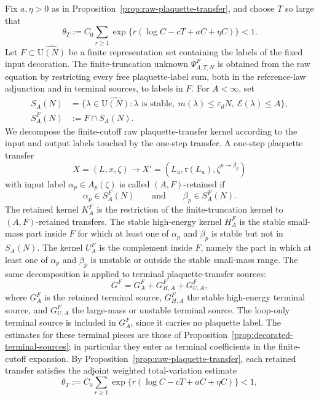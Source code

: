 \documentclass[11pt,a4paper,reqno]{amsart}
\theoremstyle{definition}
\theoremstyle{remark}
\newcommand\U{{\mathrm U}}
\begin{document}
Fix $a,\eta>0$ as in Proposition~\ref{prop:raw-plaquette-transfer}, and choose $T$ so large that
\begin{equation}
\label{eq:good-transfer-contraction}
\theta_T
:=C_0\sum_{r\ge1}\exp\{r(\log C-cT+aC+\eta C)\}<1.
\end{equation}
Let $F\subset\widehat{\U(N)}$ be a finite representation set containing the labels of the fixed input decoration.  The finite-truncation unknown $\Psi^F_{\Lambda,T,N}$ is obtained from the raw equation by restricting every free plaquette-label sum, both in the reference-law adjunction and in terminal sources, to labels in $F$.  For $A<\infty$, set
\[
\begin{aligned}
S_A(N)&=\{\lambda\in\widehat{\U(N)}:
\lambda\text{ is stable},\ m(\lambda)\le\varepsilon_dN,
\ \mathcal E(\lambda)\le A\},\\
S_A^F(N)&:=F\cap S_A(N).
\end{aligned}
\]
We decompose the finite-cutoff raw plaquette-transfer kernel according to the input and output labels touched by the one-step transfer. A one-step plaquette transfer
\[
X=(L,x,\zeta)\longrightarrow X'=(L_u,\mathfrak r(L_u),\zeta^{p\to\beta_p})
\]
with input label $\alpha_p\in A_p(\zeta)$ is called $(A,F)$-retained if
\[
\alpha_p\in S_A^F(N)\qquad\text{and}\qquad \beta_p\in S_A^F(N).
\]
The retained kernel $K_A^F$ is the restriction of the finite-truncation kernel to $(A,F)$-retained transfers. The stable high-energy kernel $H_A^F$ is the stable small-mass part inside $F$ for which at least one of $\alpha_p$ and $\beta_p$ is stable but not in $S_A(N)$. The kernel $U_A^F$ is the complement inside $F$, namely the part in which at least one of $\alpha_p$ and $\beta_p$ is unstable or outside the stable small-mass range.  The same decomposition is applied to terminal plaquette-transfer sources:
\[
G^F=G_A^F+G_{H,A}^F+G_{U,A}^F,
\]
where $G_A^F$ is the retained terminal source, $G_{H,A}^F$ the stable high-energy terminal source, and $G_{U,A}^F$ the large-mass or unstable terminal source.  The loop-only terminal source is included in $G_A^F$, since it carries no plaquette label.  The estimates for these terminal pieces are those of Proposition~\ref{prop:decorated-terminal-sources}; in particular they enter as terminal coefficients in the finite-cutoff expansion. By Proposition~\ref{prop:raw-plaquette-transfer}, each retained transfer satisfies the adjoint weighted total-variation estimate
\begin{equation}
\label{eq:retained-good-kernel-bound}
\theta_T
:=C_0\sum_{r\ge1}\exp\{r(\log C-cT+aC+\eta C)\}<1,
\end{equation}
\end{document}
